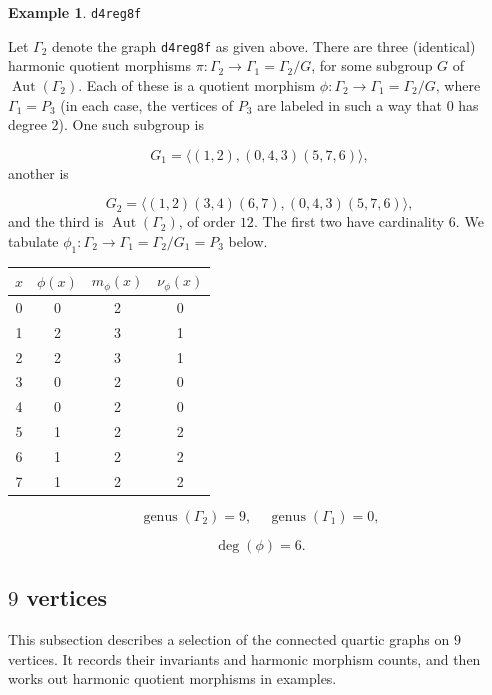 \documentclass[12pt,letterpaper]{article}
\theoremstyle{definition}
\newtheorem{example}[theorem]{Example}
\DeclareMathOperator{\Aut}{Aut}
\DeclareMathOperator{\genus}{genus}
\begin{document}
\begin{example}%
\label{example:d4reg8f}
 {\tt d4reg8f}\newline
{\rm  
  Let $\Gamma_2$ denote the graph {\tt d4reg8f} as given above.
There are three (identical) harmonic quotient morphisms
$\pi: \Gamma_2\to \Gamma_1=\Gamma_2/G$,
for some subgroup $G$ of $\Aut(\Gamma_2)$.
Each of these is a quotient morphism
$\phi: \Gamma_2\to \Gamma_1=\Gamma_2/G$,
where $\Gamma_1=P_3$ (in each case, the vertices of $P_3$
are labeled in such a way that $0$ has degree $2$).
One such subgroup is

\[
G_1 = \langle (1,2), (0,4,3)(5,7,6) \rangle,
\]
another is

\[
G_2 = \langle (1,2)(3,4)(6,7), (0,4,3)(5,7,6) \rangle,
\]
and the third is $\Aut(\Gamma_2)$, of order $12$.
The first two have cardinality $6$. We tabulate
$\phi_1: \Gamma_2\to \Gamma_1=\Gamma_2/G_1=P_3$
below.

\begin{center}
\begin{tabular}{c|c|c|c}  
  $x$ & $\phi(x)$ & $m_\phi(x)$ & $\nu_\phi(x)$ \\ \hline
  0   &    0   &        2         &  0   \\ 
  1   &    2   &        3         &  1  \\ 
  2   &    2   &        3         &  1  \\ 
  3   &    0   &        2         &  0  \\ 
  4   &    0   &        2         &  0   \\
  5   &    1   &        2         &  2   \\
  6   &    1   &        2         &  2   \\
  7   &    1   &        2         &  2   \\     
\end{tabular}
\end{center}

\[
  \genus(\Gamma_2) =9,\ \ \ \ \
  \genus(\Gamma_1) =0,
\]

\[
\deg(\phi) =6.
\]

}
\end{example}


\subsection{\texorpdfstring{$9$}{9} vertices}
\label{sec:d4reg9}

This subsection describes a selection of the connected quartic graphs on $9$ vertices.
It records their invariants and harmonic morphism counts, and then
works out harmonic quotient morphisms in examples.
\end{document}
